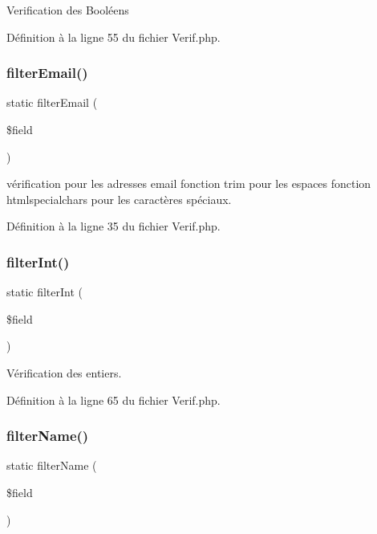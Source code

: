 Verification des Booléens 

Définition à la ligne 55 du fichier Verif.\+php.

\mbox{\label{class_app_1_1_verif_ad27d2a83b777170b7a7309c28b0b6976}} 
\subsubsection{\texorpdfstring{filter\+Email()}{filterEmail()}}
{\footnotesize\ttfamily static filter\+Email (\begin{DoxyParamCaption}\item[{}]{\$field }\end{DoxyParamCaption})\hspace{0.3cm}{\ttfamily [static]}}

vérification pour les adresses email fonction trim pour les espaces fonction htmlspecialchars pour les caractères spéciaux. 

Définition à la ligne 35 du fichier Verif.\+php.

\mbox{\label{class_app_1_1_verif_abb832f72a01d33d452acfc2f67bc776f}} 
\subsubsection{\texorpdfstring{filter\+Int()}{filterInt()}}
{\footnotesize\ttfamily static filter\+Int (\begin{DoxyParamCaption}\item[{}]{\$field }\end{DoxyParamCaption})\hspace{0.3cm}{\ttfamily [static]}}

Vérification des entiers. 

Définition à la ligne 65 du fichier Verif.\+php.

\mbox{\label{class_app_1_1_verif_ae66ae460929735528668ff5a64355e1c}} 
\subsubsection{\texorpdfstring{filter\+Name()}{filterName()}}
{\footnotesize\ttfamily static filter\+Name (\begin{DoxyParamCaption}\item[{}]{\$field }\end{DoxyParamCaption})\hspace{0.3cm}{\ttfamily [static]}}

